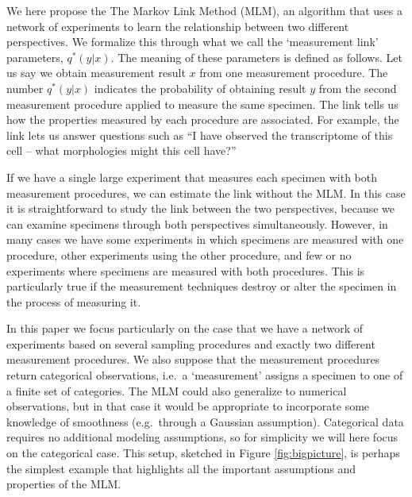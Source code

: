 We here propose the The Markov Link Method (MLM), an algorithm that uses a network of experiments to learn the relationship between two different perspectives.  We formalize this through what we call the `measurement link' parameters, $q^*(y|x)$.  The meaning of these parameters is defined as follows.  Let us say we obtain measurement result $x$ from one measurement procedure.  The number $q^*(y|x)$ indicates the probability of obtaining result $y$ from the second measurement procedure applied to measure the same specimen.  The link tells us how the properties measured by each procedure are associated.  For example, the link lets us answer questions such as ``I have observed the transcriptome of this cell -- what morphologies might this cell have?''

If we have a single large experiment that measures each specimen with both measurement procedures, we can estimate the link without the MLM.  In this case it is straightforward to study the link between the two perspectives, because we can examine specimens through both perspectives simultaneously.  However, in many cases we have some experiments in which specimens are measured with one procedure, other experiments using the other procedure, and few or no experiments where specimens are measured with both procedures.  This is particularly true if the measurement techniques destroy or alter the specimen in the process of measuring it.  

In this paper we focus particularly on the case that we have a network of experiments based on several sampling procedures and exactly two different measurement procedures.  We also suppose that the measurement procedures return categorical observations, i.e.\ a `measurement' assigns a specimen to one of a finite set of categories.  The MLM could also generalize to numerical observations, but in that case it would be appropriate to incorporate some knowledge of smoothness (e.g.\ through a Gaussian assumption).  Categorical data requires no additional modeling assumptions, so for simplicity we will here focus on the categorical case.  This setup, sketched in Figure \ref{fig:bigpicture}, is perhaps the simplest example that highlights all the important assumptions and properties of the MLM.

